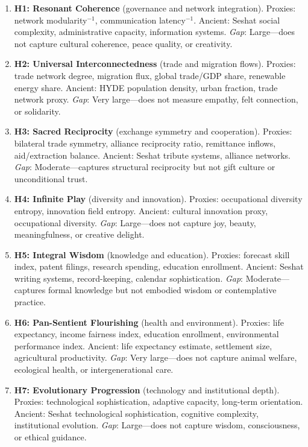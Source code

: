 \documentclass[10pt,letterpaper]{article}
\begin{document}
\begin{enumerate}
\item \textbf{H1: Resonant Coherence} (governance and network integration).
Proxies: network modularity$^{-1}$, communication latency$^{-1}$.
Ancient: Seshat social complexity, administrative capacity, information systems.
\emph{Gap}: Large---does not capture cultural coherence, peace quality, or creativity.

\item \textbf{H2: Universal Interconnectedness} (trade and migration flows).
Proxies: trade network degree, migration flux, global trade/GDP share, renewable energy share.
Ancient: HYDE population density, urban fraction, trade network proxy.
\emph{Gap}: Very large---does not measure empathy, felt connection, or solidarity.

\item \textbf{H3: Sacred Reciprocity} (exchange symmetry and cooperation).
Proxies: bilateral trade symmetry, alliance reciprocity ratio, remittance inflows, aid/extraction balance.
Ancient: Seshat tribute systems, alliance networks.
\emph{Gap}: Moderate---captures structural reciprocity but not gift culture or unconditional trust.

\item \textbf{H4: Infinite Play} (diversity and innovation).
Proxies: occupational diversity entropy, innovation field entropy.
Ancient: cultural innovation proxy, occupational diversity.
\emph{Gap}: Large---does not capture joy, beauty, meaningfulness, or creative delight.

\item \textbf{H5: Integral Wisdom} (knowledge and education).
Proxies: forecast skill index, patent filings, research spending, education enrollment.
Ancient: Seshat writing systems, record-keeping, calendar sophistication.
\emph{Gap}: Moderate---captures formal knowledge but not embodied wisdom or contemplative practice.

\item \textbf{H6: Pan-Sentient Flourishing} (health and environment).
Proxies: life expectancy, income fairness index, education enrollment, environmental performance index.
Ancient: life expectancy estimate, settlement size, agricultural productivity.
\emph{Gap}: Very large---does not capture animal welfare, ecological health, or intergenerational care.

\item \textbf{H7: Evolutionary Progression} (technology and institutional depth).
Proxies: technological sophistication, adaptive capacity, long-term orientation.
Ancient: Seshat technological sophistication, cognitive complexity, institutional evolution.
\emph{Gap}: Large---does not capture wisdom, consciousness, or ethical guidance.
\end{enumerate}
\end{document}
